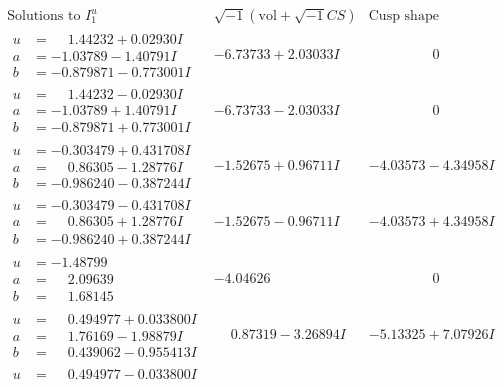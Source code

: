 \documentclass[1p]{elsarticle_modified}
\theoremstyle{definition}
\newcommand{\I}{\sqrt{-1}}
\begin{document}
$$\begin{array}{c|c|c}
\text{Solutions to }I^u_{1}& \I (\text{vol} + \sqrt{-1}CS) & \text{Cusp shape}\\
 \hline 
\begin{aligned}
u &= \phantom{-}1.44232 + 0.02930 I \\
a &= -1.03789 - 1.40791 I \\
b &= -0.879871 - 0.773001 I\end{aligned}
 & -6.73733 + 2.03033 I & \phantom{-0.000000 } 0 \\ \hline\begin{aligned}
u &= \phantom{-}1.44232 - 0.02930 I \\
a &= -1.03789 + 1.40791 I \\
b &= -0.879871 + 0.773001 I\end{aligned}
 & -6.73733 - 2.03033 I & \phantom{-0.000000 } 0 \\ \hline\begin{aligned}
u &= -0.303479 + 0.431708 I \\
a &= \phantom{-}0.86305 - 1.28776 I \\
b &= -0.986240 - 0.387244 I\end{aligned}
 & -1.52675 + 0.96711 I & -4.03573 - 4.34958 I \\ \hline\begin{aligned}
u &= -0.303479 - 0.431708 I \\
a &= \phantom{-}0.86305 + 1.28776 I \\
b &= -0.986240 + 0.387244 I\end{aligned}
 & -1.52675 - 0.96711 I & -4.03573 + 4.34958 I \\ \hline\begin{aligned}
u &= -1.48799\phantom{ +0.000000I} \\
a &= \phantom{-}2.09639\phantom{ +0.000000I} \\
b &= \phantom{-}1.68145\phantom{ +0.000000I}\end{aligned}
 & -4.04626\phantom{ +0.000000I} & \phantom{-0.000000 } 0 \\ \hline\begin{aligned}
u &= \phantom{-}0.494977 + 0.033800 I \\
a &= \phantom{-}1.76169 - 1.98879 I \\
b &= \phantom{-}0.439062 - 0.955413 I\end{aligned}
 & \phantom{-}0.87319 - 3.26894 I & -5.13325 + 7.07926 I \\ \hline\begin{aligned}
u &= \phantom{-}0.494977 - 0.033800 I \\

\end{aligned}
\end{array}$$
\end{document}
